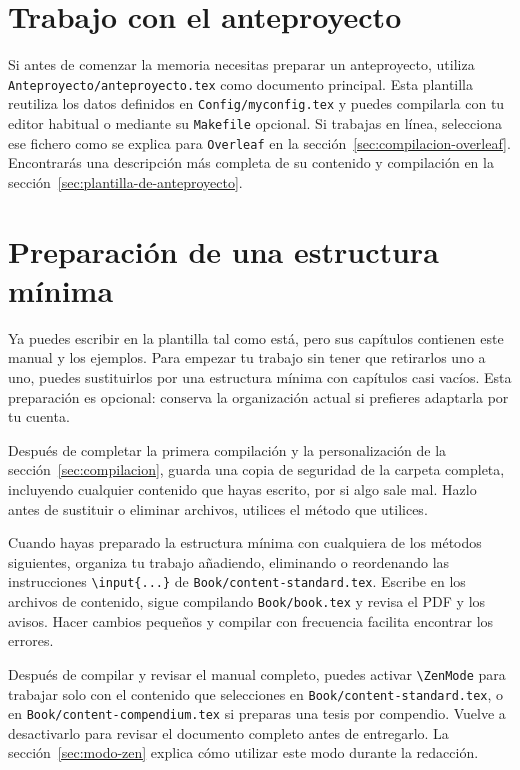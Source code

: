\section{Trabajo con el anteproyecto}
\label{sec:primeros-pasos-anteproyecto}

Si antes de comenzar la memoria necesitas preparar un anteproyecto, utiliza \texttt{Anteproyecto/anteproyecto.tex} como documento principal. Esta plantilla reutiliza los datos definidos en \texttt{Config/myconfig.tex} y puedes compilarla con tu editor habitual o mediante su \texttt{Makefile} opcional. Si trabajas en línea, selecciona ese fichero como se explica para \texttt{Overleaf} en la sección~\ref{sec:compilacion-overleaf}. Encontrarás una descripción más completa de su contenido y compilación en la sección~\ref{sec:plantilla-de-anteproyecto}.

\section{Preparación de una estructura mínima}
\label{sec:estructura-minima}

Ya puedes escribir en la plantilla tal como está, pero sus capítulos contienen este manual y los ejemplos. Para empezar tu trabajo sin tener que retirarlos uno a uno, puedes sustituirlos por una estructura mínima con capítulos casi vacíos. Esta preparación es opcional: conserva la organización actual si prefieres adaptarla por tu cuenta.

Después de completar la primera compilación y la personalización de la sección~\ref{sec:compilacion}, guarda una copia de seguridad de la carpeta completa, incluyendo cualquier contenido que hayas escrito, por si algo sale mal. Hazlo antes de sustituir o eliminar archivos, utilices el método que utilices.

Cuando hayas preparado la estructura mínima con cualquiera de los métodos siguientes, organiza tu trabajo añadiendo, eliminando o reordenando las instrucciones \texttt{\textbackslash{}input\{...\}} de \texttt{Book/content-standard.tex}. Escribe en los archivos de contenido, sigue compilando \texttt{Book/book.tex} y revisa el PDF y los avisos. Hacer cambios pequeños y compilar con frecuencia facilita encontrar los errores.

Después de compilar y revisar el manual completo, puedes activar \texttt{\textbackslash{}ZenMode} para trabajar solo con el contenido que selecciones en \texttt{Book/content-standard.tex}, o en \texttt{Book/content-compendium.tex} si preparas una tesis por compendio. Vuelve a desactivarlo para revisar el documento completo antes de entregarlo. La sección~\ref{sec:modo-zen} explica cómo utilizar este modo durante la redacción.

